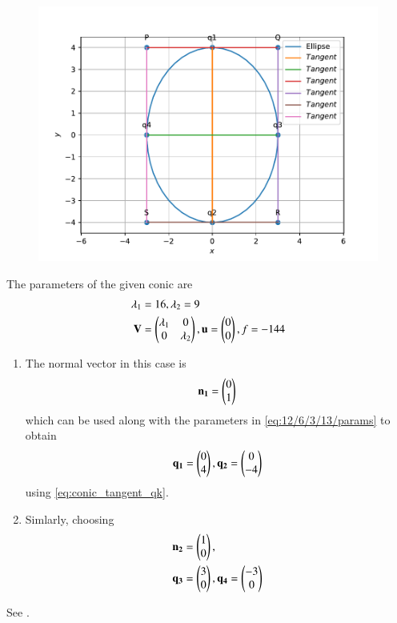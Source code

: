 	\begin{figure}[!h]
		\centering
 \includegraphics[width=\columnwidth]{chapters/12/6/3/13/figs/conic_1.pdf}
		\caption{}
		\label{fig:12/6/3/13}
  	\end{figure}
The parameters of the given conic are
\begin{align}
	\lambda_1&=16,\lambda_2=9 \\ \mathbf{V} &= \begin{pmatrix}	\lambda_1& 0 \\
			          0 & \lambda_2\end{pmatrix}  
		    , \mathbf{u} = \begin{pmatrix}0 \\0\end{pmatrix}, f = -144
		\label{eq:12/6/3/13/params}
	\end{align}
\begin{enumerate}
	\item The 
normal vector  in this case is
\begin{align}
		\mathbf{n_1}=\begin{pmatrix}0\\1\end{pmatrix}
\end{align}
which can be used along with the parameters in 
		\eqref{eq:12/6/3/13/params}
		to obtain 
\begin{equation}
\mathbf{q_1}=\begin{pmatrix}0\\4\end{pmatrix},
\mathbf{q_2}=\begin{pmatrix}0\\-4\end{pmatrix}
\end{equation}
using 
\eqref{eq:conic_tangent_qk}.
\item Simlarly, 
	choosing
\begin{align}
	\mathbf{n_2}&=\begin{pmatrix}1\\0\end{pmatrix},
	\\
	\mathbf{q_3}&=\begin{pmatrix}3\\0\end{pmatrix},
	\mathbf{q_4}=\begin{pmatrix}-3\\0\end{pmatrix}
\end{align}
\end{enumerate}
		See .
